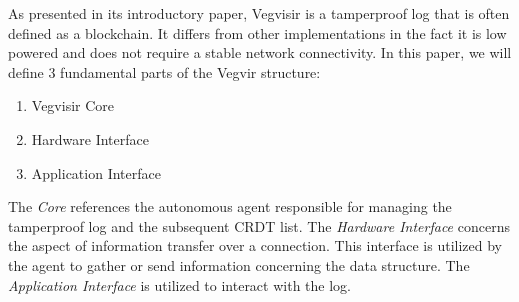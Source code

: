 

As presented in its introductory paper\cite{karlsson2018vegvisir}, Vegvisir is
a tamperproof log that is often defined as a blockchain. It differs from other
implementations in the fact it is low powered and does not require a
stable network connectivity. In this paper, we will define 3 fundamental parts
of the Vegvir structure:
\begin{enumerate}
    \item Vegvisir Core
    \item Hardware Interface
    \item Application Interface
\end{enumerate}

The \emph{Core} references the autonomous agent responsible for managing the
tamperproof log and the subsequent CRDT list. The \emph{Hardware Interface}
concerns the aspect of information transfer over a connection. This interface
is utilized by the agent to gather or send information concerning the data
structure. The \emph{Application Interface} is utilized to interact with the
log.
